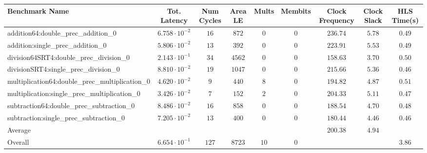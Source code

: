 \begin{tabular}{|l|c|c|c|c|c|c|c|c|}
\hline
Benchmark Name                                   & Tot. Latency            & Num Cycles & Area LE  & Mults  & Membits & Clock Frequency & Clock Slack & HLS Time(s) \\
\hline
addition64:double\_prec\_addition\_0             & $ 6.758 \cdot 10^{-2} $ & $ 16     $ & $ 872  $ & $ 0  $ & $ 0   $ & $ 236.74      $ & $ 5.78    $ & $ 0.49    $ \\
addition:single\_prec\_addition\_0               & $ 5.806 \cdot 10^{-2} $ & $ 13     $ & $ 392  $ & $ 0  $ & $ 0   $ & $ 223.91      $ & $ 5.53    $ & $ 0.49    $ \\
division64SRT4:double\_prec\_division\_0         & $ 2.143 \cdot 10^{-1} $ & $ 34     $ & $ 4562 $ & $ 0  $ & $ 0   $ & $ 158.63      $ & $ 3.70    $ & $ 0.50    $ \\
divisionSRT4:single\_prec\_division\_0           & $ 8.810 \cdot 10^{-2} $ & $ 19     $ & $ 1047 $ & $ 0  $ & $ 0   $ & $ 215.66      $ & $ 5.36    $ & $ 0.46    $ \\
multiplication64:double\_prec\_multiplication\_0 & $ 4.620 \cdot 10^{-2} $ & $ 9      $ & $ 440  $ & $ 8  $ & $ 0   $ & $ 194.82      $ & $ 4.87    $ & $ 0.51    $ \\
multiplication:single\_prec\_multiplication\_0   & $ 3.426 \cdot 10^{-2} $ & $ 7      $ & $ 152  $ & $ 2  $ & $ 0   $ & $ 204.33      $ & $ 5.11    $ & $ 0.47    $ \\
subtraction64:double\_prec\_subtraction\_0       & $ 8.486 \cdot 10^{-2} $ & $ 16     $ & $ 858  $ & $ 0  $ & $ 0   $ & $ 188.54      $ & $ 4.70    $ & $ 0.48    $ \\
subtraction:single\_prec\_subtraction\_0         & $ 7.205 \cdot 10^{-2} $ & $ 13     $ & $ 400  $ & $ 0  $ & $ 0   $ & $ 180.44      $ & $ 4.46    $ & $ 0.46    $ \\
\hline
Average                                          & $                     $ & $        $ & $      $ & $    $ & $     $ & $ 200.38      $ & $ 4.94    $ & $         $ \\
\hline
Overall                                          & $ 6.654 \cdot 10^{-1} $ & $ 127    $ & $ 8723 $ & $ 10 $ & $ 0   $ & $             $ & $         $ & $ 3.86    $ \\
\hline
\end{tabular}
